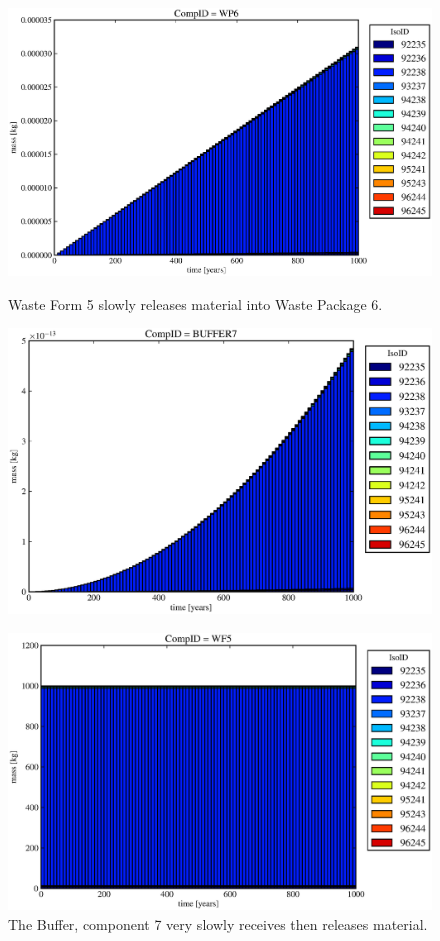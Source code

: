 \begin{figure}[ht]
\begin{minipage}[b]{0.45\linewidth}
  \includegraphics[width=\textwidth]{./chapters/demonstration/base/od2.eps}
  \caption[Case ODI Waste Form Contaminants.]{
    Waste Form 5 slowly releases material into Waste Package 6.
    }
  \label{fig:drIVwf5}
  \includegraphics[width=\textwidth]{./chapters/demonstration/base/od3.eps}
  \caption[Case ODI Buffer Contaminants]{
    The Buffer, component 7 very slowly receives then releases material.
    }
  \label{fig:drIVbuff}
\end{minipage}
\hspace{0.05\linewidth}
\begin{minipage}[b]{0.45\linewidth}
  \includegraphics[width=\textwidth]{./chapters/demonstration/base/od1.eps}

\end{minipage}
\end{figure}
